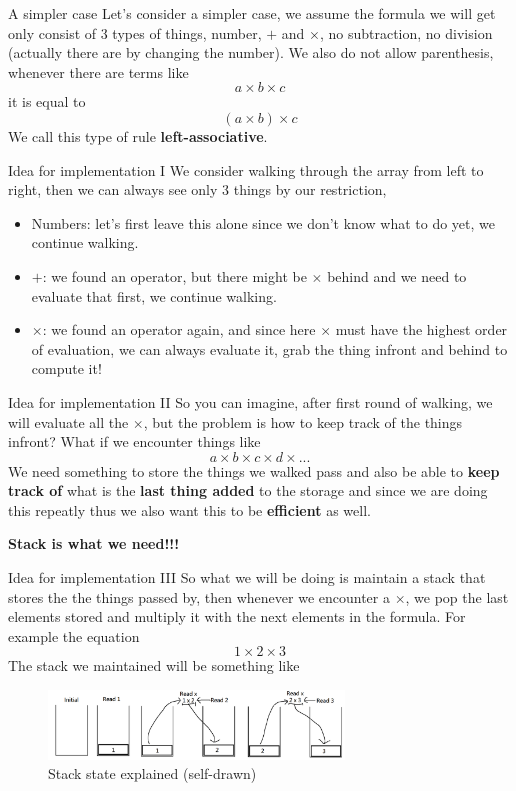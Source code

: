 \documentclass[10pt,xcolor={table,dvipsnames},t]{beamer}
\begin{document}
\begin{frame}{A simpler case}
  Let's consider a simpler case, we assume the formula we will get only consist of 3 types of things, number, $+$ and $\times$, no subtraction, no division (actually there are by changing the number). We also do not allow parenthesis, whenever there are terms like
  $$a\times b\times c$$
  it is equal to 
  $$(a\times b)\times c$$
  We call this type of rule \textbf{left-associative}.
\end{frame}

\begin{frame}{Idea for implementation I}
  We consider walking through the array from left to right, then we can always see only 3 things by our restriction,
  \begin{itemize}
    \item Numbers: let's first leave this alone since we don't know what to do yet, we continue walking.
    \item $+$: we found an operator, but there might be $\times$ behind and we need to evaluate that first, we continue walking.
    \item $\times$: we found an operator again, and since here $\times$ must have the highest order of evaluation, we can always evaluate it, grab the thing infront and behind to compute it!
  \end{itemize}
\end{frame}

\begin{frame}{Idea for implementation II}
  So you can imagine, after first round of walking, we will evaluate all the $\times$, but the problem is how to keep track of the things infront? What if we encounter things like 
  $$a\times b\times c\times d\times ...$$
  We need something to store the things we walked pass and also be able to \textbf{keep track of} what is the \textbf{last thing added} to the storage and since we are doing this repeatly thus we also want this to be \textbf{efficient} as well.\\
  \begin{center}
    \textbf{Stack is what we need!!!}
  \end{center}
\end{frame}

\begin{frame}{Idea for implementation III}
  So what we will be doing is maintain a stack that stores the the things passed by, then whenever we encounter a $\times$, we pop the last elements stored and multiply it with the next elements in the formula. For example the equation 
  $$1\times 2\times 3$$
  The stack we maintained will be something like
  \begin{figure}[h!]
    \includegraphics[width=0.7\textwidth]{img/ParserEg.png}
    \caption{Stack state explained (self-drawn)}
  \end{figure}
\end{frame}
\end{document}
